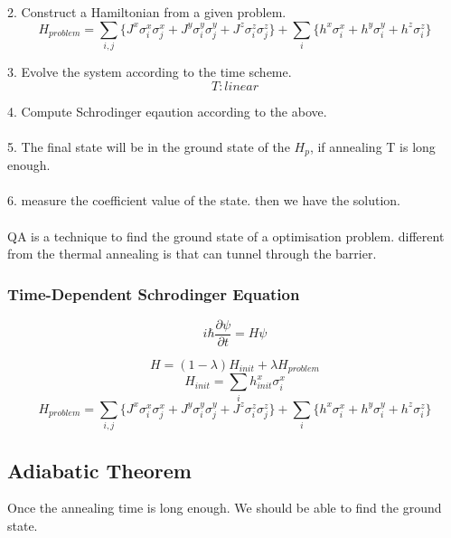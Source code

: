 \documentclass[twoside,a4paper,article]{combine}
\begin{document}
2. Construct a Hamiltonian from a given problem.
\begin{equation*}
	H_{problem}=\sum_{i,j} \{J^x \sigma^x_i \sigma^x_j+J^y \sigma^y_i \sigma^y_j+J^z \sigma^z_i \sigma^z_j \}+ \sum_{i} \{h^x \sigma^x_i+h^y \sigma^y_i+h^z \sigma^z_i\}
\end{equation*}   

3. Evolve the system according to the time scheme.
\begin{equation*}
	T:linear 
\end{equation*}

4. Compute Schrodinger eqaution according to the above.\\
\\
5. The final state will be in the ground state of the $H_p$, if annealing T is long enough.\\
\\
6. measure the coefficient value of the state. then we have the solution.\\
\\



QA is a technique to find the ground state of a optimisation problem. different from the thermal annealing is that can tunnel through the barrier. 


\subsubsection{Time-Dependent Schrodinger Equation}
\begin{equation*}
i\hbar\frac{\partial \psi}{\partial t}=H\psi
\end{equation*}

\begin{equation*}
H=(1-\lambda)H_{init}+\lambda H_{problem}
\end{equation*}
\begin{equation*}
H_{init}=\sum_{i} h^x_{init} \sigma^x_i
\end{equation*}
\begin{equation*}
H_{problem}=\sum_{i,j} \{J^x \sigma^x_i \sigma^x_j+J^y \sigma^y_i \sigma^y_j+J^z \sigma^z_i \sigma^z_j \}+ \sum_{i} \{h^x \sigma^x_i+h^y \sigma^y_i+h^z \sigma^z_i\}
\end{equation*}

\subsection{Adiabatic Theorem}
Once the annealing time is long enough. We should be able to find the ground state.
\end{document}
